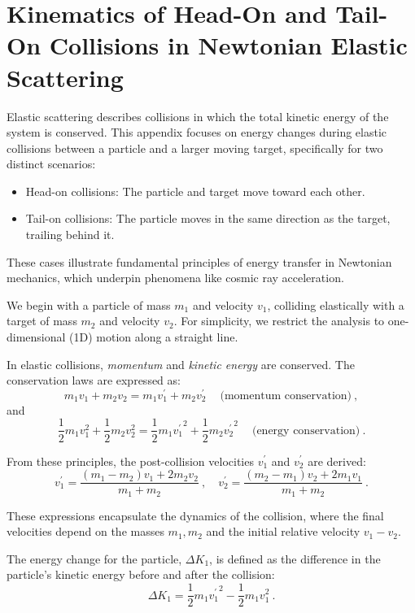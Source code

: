 \section{Kinematics of Head-On and Tail-On Collisions in Newtonian Elastic Scattering}
\label{app:collisions}

Elastic scattering describes collisions in which the total kinetic energy of the system is conserved. This appendix focuses on energy changes during elastic collisions between a particle and a larger moving target, specifically for two distinct scenarios:  
%
\begin{itemize}
\item Head-on collisions: The particle and target move toward each other.
\item Tail-on collisions: The particle moves in the same direction as the target, trailing behind it.  
\end{itemize}

These cases illustrate fundamental principles of energy transfer in Newtonian mechanics, which underpin phenomena like cosmic ray acceleration.

We begin with a particle of mass \( m_1 \) and velocity \( v_1 \), colliding elastically with a target of mass \( m_2 \) and velocity \( v_2 \). For simplicity, we restrict the analysis to one-dimensional (1D) motion along a straight line.  

In elastic collisions, \emph{momentum} and \emph{kinetic energy} are conserved. 
%
The conservation laws are expressed as:  
\[
m_1 v_1 + m_2 v_2 = m_1 v_1^\prime + m_2 v_2^\prime~\quad\text{(momentum conservation)}~,
\]  
and
\[
\frac{1}{2} m_1 v_1^2 + \frac{1}{2} m_2 v_2^2 = \frac{1}{2} m_1 {v_1^\prime}^2 + \frac{1}{2} m_2 {v_2^\prime}^2~\quad\text{(energy conservation)}~.
\]

From these principles, the post-collision velocities \( v_1^\prime \) and \( v_2^\prime \) are derived:  
\[
v_1^\prime = \frac{(m_1 - m_2)v_1 + 2 m_2 v_2}{m_1 + m_2}~, \quad v_2^\prime = \frac{(m_2 - m_1)v_2 + 2 m_1 v_1}{m_1 + m_2}~.
\]

These expressions encapsulate the dynamics of the collision, where the final velocities depend on the masses \( m_1, m_2 \) and the initial relative velocity \( v_1 - v_2 \).

The energy change for the particle, \( \Delta K_1 \), is defined as the difference in the particle's kinetic energy before and after the collision:  
\[
\Delta K_1 = \frac{1}{2} m_1 {v_1^\prime}^2 - \frac{1}{2} m_1 v_1^2~.
\]

